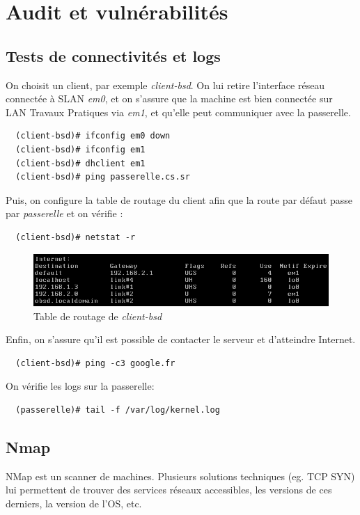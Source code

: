 \documentclass[a4paper]{article}
\begin{document}
\section{Audit et vulnérabilités}
\subsection{Tests de connectivités et logs}
On choisit un client, par exemple \textit{client-bsd}. On lui
retire l'interface réseau connectée à SLAN \textit{em0}, et on s'assure que
la machine est bien connectée sur LAN Travaux Pratiques via \textit{em1}, et
qu'elle peut communiquer avec la passerelle. 
\begin{verbatim}
  (client-bsd)# ifconfig em0 down
  (client-bsd)# ifconfig em1
  (client-bsd)# dhclient em1
  (client-bsd)# ping passerelle.cs.sr
\end{verbatim}

\vspace{1\baselineskip}
Puis, on configure la table de routage du client afin
que la route par défaut passe par \textit{passerelle} et on vérifie :
\begin{verbatim}
  (client-bsd)# netstat -r
\end{verbatim}
\begin{figure}[!ht]
	\centering
	\includegraphics[scale=.5]{Internet.png}
	\caption{\label{routes} Table de routage de \textit{client-bsd}}
\end{figure}

\vspace{1\baselineskip}
Enfin, on s'assure qu'il est possible de contacter le serveur
 et d'atteindre Internet.
\begin{verbatim}
  (client-bsd)# ping -c3 google.fr
\end{verbatim}

\vspace{1\baselineskip}
On vérifie les logs sur la passerelle:
\begin{verbatim}
  (passerelle)# tail -f /var/log/kernel.log
\end{verbatim}

\subsection{Nmap}
NMap est un scanner de machines. Plusieurs solutions techniques (eg. TCP SYN)
lui permettent de trouver des services réseaux accessibles, les versions de
ces derniers, la version de l'OS, etc.
\end{document}
